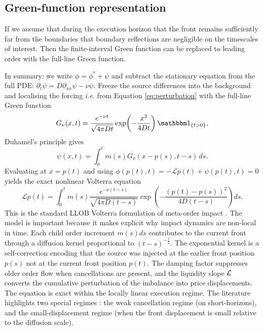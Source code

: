 \documentclass[5p,final]{elsarticle}
\begin{document}
\subsection{Green-function representation} \label{ssec:Green}

If we assume that during the execution horizon that the front remains sufficiently far from the boundaries that boundary reflections are negligible on the timescales of interest. Then the finite-interval Green function can be replaced to leading order with the full-line Green function. 

In summary: we write $\phi=\phi^*+\psi$ and subtract the stationary equation from the full PDE:
$\partial_t\psi=
D\partial_{xx}\psi-\nu\psi$. 
Freeze the source differences into the background and localising the forcing {\it i.e.} from Equation \ref{eq:perturbation} with the full-line Green function
\begin{equation}
G_\nu(x,t)=\frac{e^{-\nu t}}{\sqrt{4\pi Dt}}\exp\!\left(-\frac{x^2}{4Dt}\right)\mathbbm 1_{\{t>0\}},
\end{equation}
Duhamel's principle gives \cite{donier2015fully}
\begin{equation}
\psi(x,t)=\int_0^t m(s)G_\nu(x-p(s),t-s)\,ds.
\end{equation}
Evaluating at $x=p(t)$ and using $\phi(p(t),t)= -\mathcal L p(t)+\psi(p(t),t)=0$ yields the exact nonlinear Volterra equation \cite{donier2015fully}
\begin{equation}
    \mathcal L p(t)=\int_0^t m(s)
    \frac{e^{-\nu(t-s)}}{\sqrt{4\pi D(t-s)}}
    \exp\!\left(-\frac{(p(t)-p(s))^2}{4D(t-s)}\right)
    ds.
\label{eq:volterra}
\end{equation}
This is the standard LLOB Volterra formulation of meta-order impact \cite{donier2015fully,toth2011anomalous}. The model is important because it makes explicit why impact dynamics are non-local in time. Each child order increment $m(s) ds$ contributes to the current front through a diffusion kernel proportional to $(t-s)^{-\frac{1}{2}}$. The exponential kernel is a self-correction encoding that the source was injected at the earlier front position $p(s)$ not at the current front position $p(t)$. The damping factor suppresses older order flow when cancellations are present, and the liquidity slope $\cal L$ converts the cumulative perturbation of the imbalance into price displacements. The equation is exact within the locally linear execution regime. The literature highlights two special regimes \cite{toth2011anomalous,donier2015fully}: the weak cancellation regime (on short-horizons), and the small-displacement regime (when the front displacement is small relative to the diffusion scale). 
\end{document}

